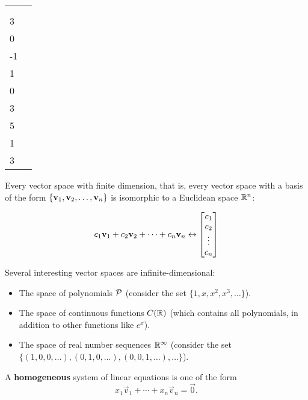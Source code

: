 \begin{applicationActivities}
\begin{activity}{15}
\begin{tabular}{ll}
 & \\
     \(\vspan\left\{
    \begin{bmatrix}5\\3\\0\\-1\end{bmatrix},
    \begin{bmatrix}-2\\1\\0\\3\end{bmatrix},
    \begin{bmatrix}4\\5\\1\\3\end{bmatrix}
    \right\}
	\) \\
\end{tabular}
\end{activity}
\begin{fact}
  Every vector space with finite dimension, that is, every
  vector space with a basis of the form
  \(\{\vect v_1,\vect v_2,\dots,\vect v_n\}\) is isomorphic to a
  Euclidean space \(\IR^n\):

  \[
    c_1\vect v_1+c_2\vect v_2+\dots+c_n\vect v_n
    \leftrightarrow
    \begin{bmatrix}
      c_1\\c_2\\\vdots\\c_n
    \end{bmatrix}
  \]
\end{fact}

\begin{observation}
  Several interesting vector spaces are infinite-dimensional:
  \begin{itemize}
    \item The space of polynomials \(\P\) (consider the set
          \(\{1,x,x^2,x^3,\dots\}\)).
    \item The space of continuous functions \(C(\IR)\) (which contains
          all polynomials, in addition to other functions like
          \(e^x\)).
    \item The space of real number sequences \(\IR^\infty\) (consider
          the set \(\{(1,0,0,\dots),(0,1,0,\dots),(0,0,1,\dots),\dots\}\)).
  \end{itemize}
\end{observation}

\begin{definition}
A \textbf{homogeneous} system of linear equations is one of the form
\[x_1 \vec{v}_1 + \cdots+x_n \vec{v}_n = \vec{0} .\]


\end{definition}
\end{applicationActivities}
